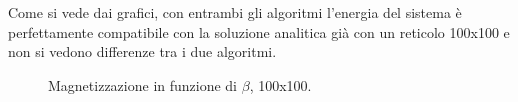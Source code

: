 Come si vede dai grafici, con entrambi gli algoritmi l'energia del sistema è perfettamente compatibile con la soluzione analitica già con un reticolo 100x100 e non si vedono differenze tra i due algoritmi.
\begin{figure}[h]
\caption{Magnetizzazione in funzione di $\beta$, 100x100.}

\end{figure}
